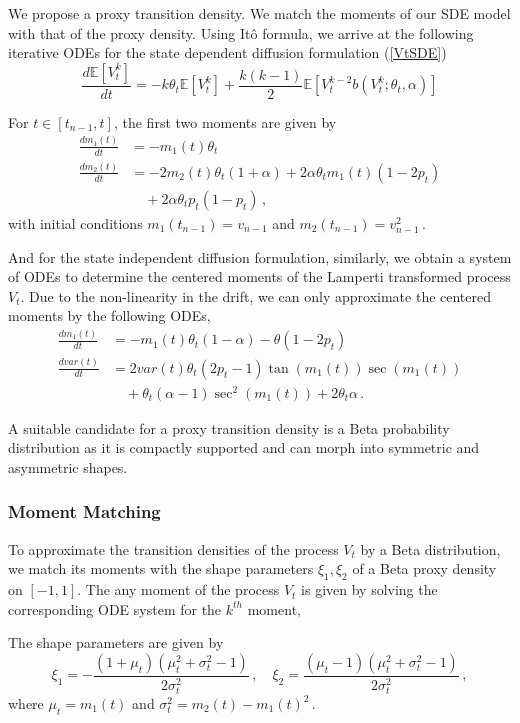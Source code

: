 \documentclass[11pt,english]{article}
\begin{document}
We propose a proxy transition density. We match the moments of our SDE model with that of the proxy density. Using It\^o formula, we arrive at the following iterative ODEs for the state dependent diffusion formulation (\ref{VtSDE})
\begin{equation}
\frac{d \mathbb{E}[ V^k_t]}{dt} = - k \theta_t \mathbb{E}[ V^k_t] + \frac{k(k-1)}{2} \mathbb{E}[ V^{k-2}_t  b(V^k_t;\theta_t, \alpha)]
\end{equation}

For $t\in [t_{n-1}, t]$, the first two moments are given by
\begin{align}
\frac{d m_1 (t)}{dt} &= - m_1(t)\theta_t   \nonumber \\
\frac{d m_2 (t)}{dt} &=  -2 m_2(t)\theta_t(1+\alpha) + 2\alpha\theta_t m_1(t)(1-2p_t)  \nonumber \\
&\quad + 2 \alpha\theta_t p_t (1-p_t) \,,
\end{align}
with initial conditions $m_1(t_{n-1})= v_{n-1}$ and $m_2(t_{n-1})= v_{n-1}^2 \,.$

And for the state independent diffusion formulation, similarly, we  obtain a system of ODEs to determine the centered moments of the Lamperti transformed process $V_t$. Due to the non-linearity in the drift, we can only approximate the centered moments by the following ODEs,
\begin{align}
\frac{d m_1 (t)}{dt} &= - m_1(t)\theta_t (1-\alpha) - \theta (1-2 p_t) \nonumber \\
\frac{d var(t)}{dt} &=  2 var(t) \theta_t (2p_t - 1 ) \tan(m_1 (t)) \sec(m_1 (t))   \nonumber \\
& \quad + \theta_t (\alpha - 1) \sec^2(m_1 (t))  + 2 \theta_t \alpha \,.
\end{align}

A suitable candidate for a proxy transition density is a Beta probability distribution as it is compactly supported and can morph into symmetric and asymmetric shapes.

\subsubsection*{ Moment Matching}
To approximate the transition densities of  the process $V_t$ by a Beta distribution, we match its moments with the shape parameters $\xi_1, \xi_2$ of a Beta proxy density on $[-1,1]$. The any moment of the process $V_t$ is  given by solving the corresponding ODE system  for the $k^{th}$  moment,

The shape parameters are given by
\begin{equation}
\xi_1 = - \frac{(1+\mu_t )(\mu_t^2 + \sigma_t^2 -1)}{2 \sigma_t^2}\,, \quad \xi_2=  \frac{(\mu_t-1 )(\mu_t^2 + \sigma_t^2 -1)}{2 \sigma_t^2} \,, \label{param_transformed_beta}
\end{equation}
where $\mu_t = m_1 (t)$ and $\sigma_t^2= m_2 (t)- m_1 (t)^2\,.$
\end{document}
